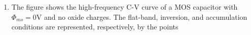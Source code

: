\documentclass[a4paper, 11pt]{article}
\begin{document}
\begin{enumerate}
\begin{enumerate}
    \end{enumerate}

    \hfill{}

    \item The figure shows the high-frequency C-V curve of a MOS capacitor  with $\Phi_{ms}=0$V and no oxide charges. The flat-band, inversion, and accumulation conditions are represented, respectively, by the points
    

\end{enumerate}
\end{document}
